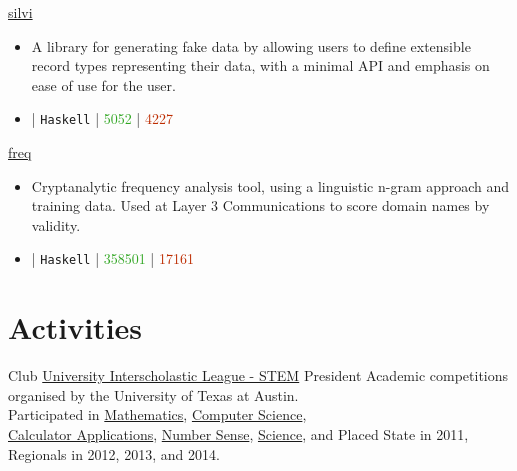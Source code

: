 \documentclass[10pt,letterpaper,sans]{moderncv}
\newcommand{\ghCommit}[1]{%
\begin{tikzpicture}[y=0.7pt,x=0.7pt,yscale=-1, inner sep=0pt, outer sep=0pt]%
  \path[even odd rule,fill=#1]%
  (10.86,7.00) .. controls (10.41,5.28) and%
  (8.86,4.00) .. (7.00,4.00) .. controls (5.14,4.00) and%
  (3.59,5.28) .. (3.14,7.00) -- (0.00,7.00) -- (0.00,9.00) --%
  (3.14,9.00) .. controls (3.59,10.72) and (5.14,12.00) ..%
  (7.00,12.00) .. controls (8.86,12.00) and (10.41,10.72) ..%
  (10.86,9.00) -- (14.00,9.00) -- (14.00,7.00) -- (10.86,7.00)%
  -- cycle(7.00,10.20) .. controls (5.78,10.20) and (4.80,9.22) ..%
  (4.80,8.00) .. controls (4.80,6.78) and (5.78,5.80) ..%
  (7.00,5.80) .. controls (8.22,5.80) and (9.20,6.78) ..%
  (9.20,8.00) .. controls (9.20,9.22) and (8.22,10.20) ..%
  (7.00,10.20) -- cycle;%
\end{tikzpicture}}
\newcommand{\wlink}[2]{\textcolor[HTML]{0020B6}{\href{#1}{#2}}}
\newcommand{\ghlink}[2]{\wlink{https://github.com/#1}{#2}}
\newcommand{\ghrepo}[1]{\ghlink{#1}{\faGithub}}
\newcommand{\ghlang}[1]{\texttt{#1}}
\newcommand{\ghcom}[1]{\textcolor[HTML]{666666}{\ghCommit{} #1}}
\newcommand{\ghadd}[1]{\textcolor[HTML]{30A622}{{\faPlusCircle} #1}}
\newcommand{\ghrem}[1]{\textcolor[HTML]{BD2C00}{{\faMinusCircle} #1}}
\newcommand{\ghtr}[0]{}
\newcommand{\ghub}[4]{\ghrepo{#2} | \ghlang{#1} | \ghadd{#3} | \ghrem{#4}}
\newcommand{\ghtable}[6]{#1 & #2 & #3 & #4 & #5 & #6 \\}
\newcommand{\ght}[9]{%
  \ghtable{#1}
          {\ghlink{#2/#3}{#3}}
          {\ghlang{#4}}
          {\ghcom{#5}}
          {\ghadd{#6}}
          {\ghrem{#7}}%
}
\begin{document}
\cventry{}
        {\wlink{https://github.com/chessai/silvi}{silvi}}
        {}{}{}
        {
\begin{itemize}
\item A library for generating fake data by allowing users to define extensible record types representing their data, with a minimal API and emphasis on ease of use for the user.
\item \ghub{Haskell}{chessai/silvi}{5052}{4227}
\end{itemize}
}

\cventry{}
        {\wlink{https://github.com/chessai/freq}{freq}}
        {}{}{}
        {
\begin{itemize}
\item Cryptanalytic frequency analysis tool, using a linguistic n-gram approach and training data. Used at Layer 3 Communications to score domain names by validity.
\item \ghub{Haskell}{chessai/freq}{358501}{17161}
\end{itemize}
}


\section{Activities}
        {Club}
        {\wlink{http://www.uiltexas.org/academics/stem}{University Interscholastic League - STEM}}
        {President}{}{
        Academic competitions organised by the University of Texas at Austin. \\ %
        Participated in %
        \wlink{http://www.uiltexas.org/academics/stem/mathematics}{Mathematics}, %
        \wlink{http://www.uiltexas.org/academics/stem/computer-science}{Computer Science}, \\ %
        \wlink{http://www.uiltexas.org/academics/stem/calculator-applications}{Calculator Applications}, %
        \wlink{http://www.uiltexas.org/academics/stem/number-sense}{Number Sense}, %
        \wlink{http://www.uiltexas.org/academics/stem/science}{Science}, and %
        Placed State in 2011, Regionals in 2012, 2013, and 2014.
}          
\end{document}
